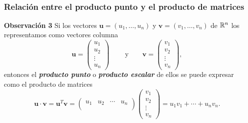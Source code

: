 \subsection{}

{\nologo
\begin{frame}\frametitle{Relación entre el producto punto y el producto de matrices}

\begin{alertblock}{\textbf{Observación 3}}\justifying
	Si los vectores $\mathbf{u}=(u_1,\hdots,u_n) $ y $\mathbf{v}=(v_1,\hdots,v_n)$ de $\mathbb{R}^n$ 
	los representamos como vectores columna
	\[
	\mathbf{u} =
	\left(
	\begin{array}{c}
	u_1\\
	u_2\\
	\vdots \\[1mm]
	u_n
	\end{array}
	\right)\ 
	\qquad \text{y} \qquad 
	\mathbf{v} =
	\left(
	\begin{array}{c}
	v_1\\
	v_2\\
	\vdots \\[1mm]
	v_n
	\end{array}
	\right), 
	\]
	entonces el \textbf{\textit{producto punto}} o \textbf{\textit{producto escalar}} de ellos
	se puede expresar como el producto de matrices
	\[
	\mathbf{u}\cdot \mathbf{v} =
	\mathbf{u}^T \mathbf{v} =
	\left(
	\begin{array}{cccc}
	u_1 & u_2 & \cdots & u_n \\
	\end{array}
	\right) 
	\left(
	\begin{array}{c}
	v_1\\
	v_2\\
	\vdots \\[1mm]
	v_n
	\end{array}
	\right)
	= u_1 v_1 +  \cdots + u_nv_n. 
	\]
\end{alertblock}

\end{frame}
}


\subsection{}

